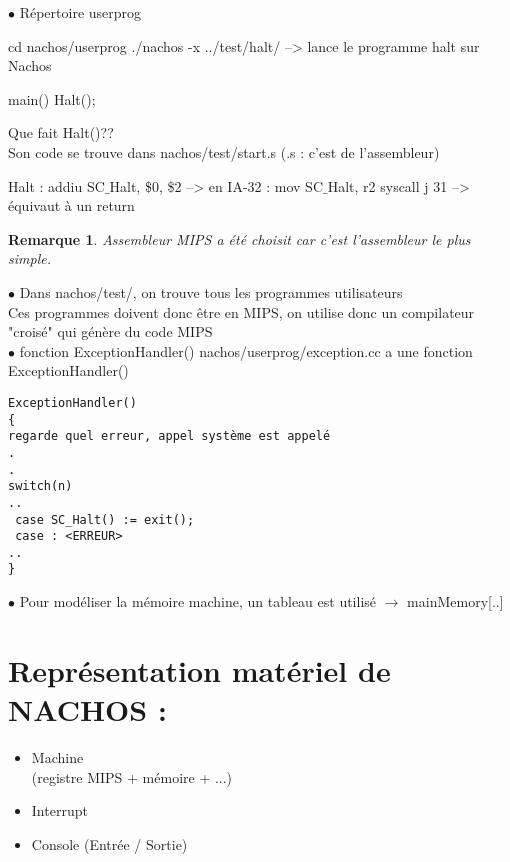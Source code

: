\documentclass[12pt,a4paper]{report}
\newtheorem*{rem}{Remarque}
\begin{document}
\bigskip
$\bullet$ Répertoire userprog
\begin{verbatimtab}
cd nachos/userprog 
./nachos -x ../test/halt/   --> lance le programme halt sur Nachos

 main()
{
 Halt();
}
\end{verbatimtab}

Que fait Halt()?? \\
Son code se trouve dans nachos/test/start.s (.s : c'est de l'assembleur)\\
\begin{verbatimtab}
Halt : addiu SC$\_$Halt, \$0, \$2     --> en IA-32 : mov SC$\_$Halt, r2
       syscall
       j 31            --> équivaut à un return
\end{verbatimtab}

\begin{rem}Assembleur MIPS a été choisit car c'est l'assembleur le plus simple.\end{rem}

\bigskip

$\bullet$ Dans nachos/test/, on trouve tous les programmes utilisateurs\\
Ces programmes doivent donc être en MIPS, on utilise donc un compilateur "croisé" qui génère du code MIPS\\ 

$\bullet$ fonction ExceptionHandler()
nachos/userprog/exception.cc a une fonction ExceptionHandler()
\begin{verbatim}
ExceptionHandler()  
{
regarde quel erreur, appel système est appelé
.
.
switch(n)
..
 case SC_Halt() := exit();
 case : <ERREUR>
..
}
\end{verbatim}

$\bullet$ Pour modéliser la mémoire machine, un tableau est utilisé $\rightarrow$ mainMemory[..]


\section{Représentation matériel de NACHOS :} 
\begin{itemize}
\item Machine\\
(registre MIPS + mémoire + ...)
\item Interrupt
\item Console
(Entrée / Sortie)
\\
\end{itemize}
\end{document}
